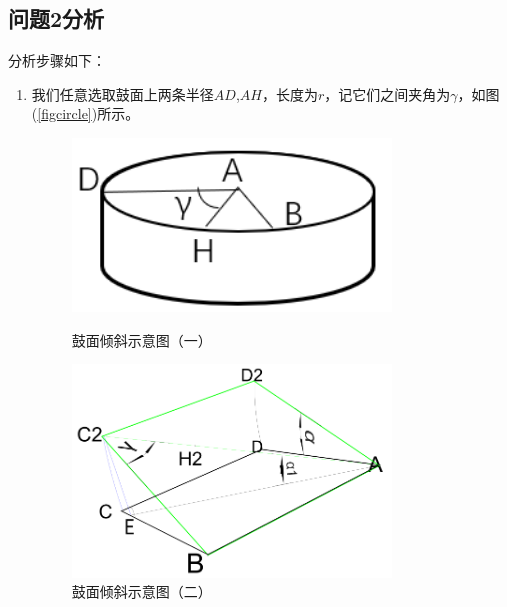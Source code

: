 \documentclass{cumcm}
\begin{document}
\subsection{问题2分析}
分析步骤如下：
\begin{enumerate}
\item 我们任意选取鼓面上两条半径$AD$,$AH$，长度为$r$，记它们之间夹角为$\gamma$，如图(\ref{figcircle})所示。
\begin{figure}[H]
  \begin{minipage}[t]{0.5\linewidth}   
    \centering   
    \includegraphics[width=0.8\textwidth]{img/circle.png}   
    \caption{鼓面倾斜示意图（一）}   
    \label{figcircle}   
  \end{minipage}   
   \begin{minipage}[t]{0.5\linewidth}   
      \centering   
      \includegraphics[width=0.8\textwidth]{img/change.png}   
      \caption{鼓面倾斜示意图（二）}   
      \label{fig:change}   
    \end{minipage} 
\end{figure}


\end{enumerate}
\end{document}
